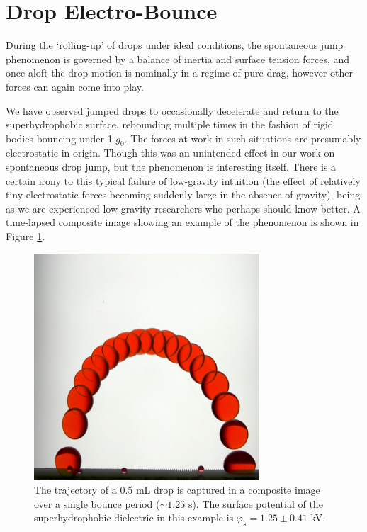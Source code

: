 \documentclass[12pt,a4paper,oneside]{book}
\begin{document}
\section{Drop Electro-Bounce}
During the `rolling-up' of drops under ideal conditions, the spontaneous jump phenomenon is governed by a balance of inertia and surface tension forces, and once aloft the drop motion is nominally in a regime of pure drag, however other forces can again come into play. 

We have observed jumped drops to occasionally decelerate and return to the superhydrophobic surface, rebounding multiple times in the fashion of rigid bodies bouncing under 1-$g_0$. The forces at work in such situations are presumably electrostatic in origin. Though this was an unintended effect in our work on spontaneous drop jump, but the phenomenon is interesting itself. There is a certain irony to this typical failure of low-gravity intuition (the effect of relatively tiny electrostatic forces becoming suddenly large in the absence of gravity), being as we are experienced low-gravity researchers who perhaps should know better. A time-lapsed composite image showing an example of the phenomenon is shown in Figure \ref{fig:bounce}.
\begin{figure}[htb]
\centering
\includegraphics[width=0.75\textwidth]{bounce}
\caption{The trajectory of a 0.5 mL drop is captured in a composite image over a single bounce period ($\sim 1.25$ s). The surface potential of the superhydrophobic dielectric in this example is $\varphi_s = 1.25 \pm 0.41$ kV. \label{fig:bounce}}
\end{figure}
\end{document}
